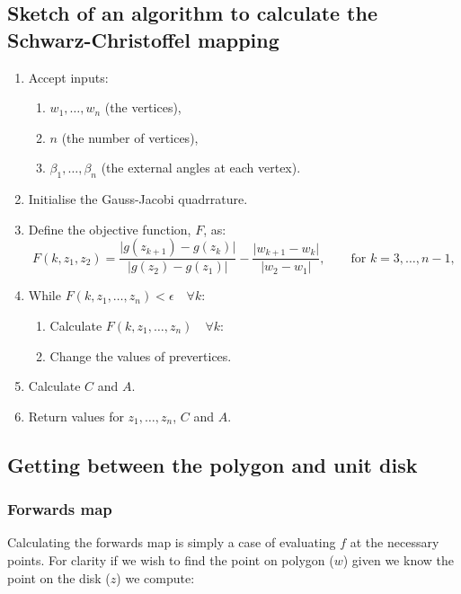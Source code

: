 \documentclass[a4paper,10pt]{amsart}
\newcommand{\sch}{Schwarz-Christoffel }
\begin{document}
\subsection{Sketch of an algorithm to calculate the \sch mapping}

\begin{enumerate}
\item Accept inputs:
   \begin{enumerate} 
      \item $w_1,\dots,w_n$ (the vertices),
      \item $n$ (the number of vertices),
      \item $\beta_1,\dots,\beta_n$ (the external angles at each vertex).
   \end{enumerate}
\item Initialise the Gauss-Jacobi quadrrature.
\item Define the objective function, $F$, as:
 \begin{equation*}
 F(k,z_1,z_2) = \frac{\vert g(z_{k+1}) -  g(z_k) \vert}{\vert g(z_2)-g(z_1)\vert} - \frac{\vert w_{k+1} - w_k\vert}{\vert w_2 - w_1\vert}, \qquad \text{for } k=3,\dots,n-1,
 \end{equation*}
\item While $F(k,z_1,\dots,z_n) < \epsilon \quad \forall k$:
\begin{enumerate}
  \item Calculate $F(k,z_1,\dots,z_n) \quad \forall k$:
  \item Change the values of prevertices.
\end{enumerate}
\item Calculate $C$ and $A$.
\item Return values for $z_1,\dots,z_n$, $C$ and $A$.
\end{enumerate}



\subsection{Getting between the polygon and unit disk}

\subsubsection{Forwards map}

Calculating the forwards map is simply a case of evaluating $f$ at the necessary points. For clarity if we wish to find the point on polygon ($w$) given we know the point on the disk ($z$) we compute:
\end{document}
